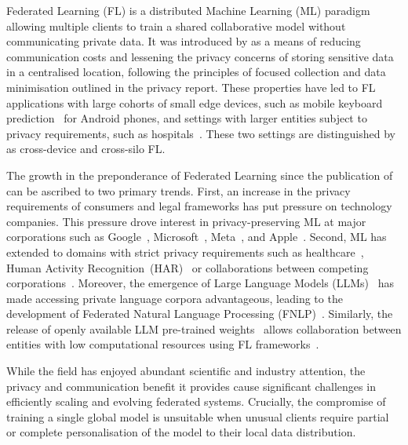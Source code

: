 
Federated Learning (FL) is a distributed Machine Learning (ML) paradigm allowing multiple clients to train a shared collaborative model without communicating private data. It was introduced by \citet{FedAvg} as a means of reducing communication costs and lessening the privacy concerns of storing sensitive data in a centralised location, following the principles of focused collection and data minimisation outlined in the \citet{White_House_Report} privacy report. These properties have led to FL applications with large cohorts of small edge devices, such as mobile keyboard prediction~\citep{GoogleKeyboard} for Android phones, and settings with larger entities subject to privacy requirements, such as hospitals~\citep{FLmedicine}. These two settings are distinguished by \citet{AdvancedAndOpenProblems} as cross-device and cross-silo FL\@.

The growth in the preponderance of Federated Learning since the publication of \citet{FedAvg} can be ascribed to two primary trends. First, an increase in the privacy requirements of consumers and legal frameworks has put pressure on technology companies. This pressure drove interest in privacy-preserving ML at major corporations such as Google~\citep{FedAvg,GoogleKeyboard,tensorflowfederated,PracticalPrivateFLkairouz21b}, Microsoft~\citep{FLINT,Flute}, Meta~\citep{PAPAYA,FedBuff}, and Apple~\citep{AppleFL}. Second, ML has extended to domains with strict privacy requirements such as healthcare~\citep{FLmedicine,FutureOfHealth,BigDataCancer}, Human Activity Recognition~(HAR)~\citep{HARusingFL_2018,ClusterFL} or collaborations between competing corporations~\citep{SustainableIncentive,TowardsFairPrivacyPreservingFL}. Moreover, the emergence of Large Language Models (LLMs)~\citep{OpportunitiesAndRisksLLM} has made accessing private language corpora advantageous, leading to the development of Federated Natural Language Processing (FNLP)~\citep{FedNLP}. Similarly, the release of openly available LLM pre-trained weights~\citep{LLaMA} allows collaboration between entities with low computational resources using FL frameworks~\citep{Flower,FedScale,FedML}.

While the field has enjoyed abundant scientific and industry attention, the privacy and communication benefit it provides cause significant challenges in efficiently scaling and evolving federated systems. Crucially, the compromise of training a single global model is unsuitable when unusual clients require partial or complete personalisation of the model to their local data distribution.

